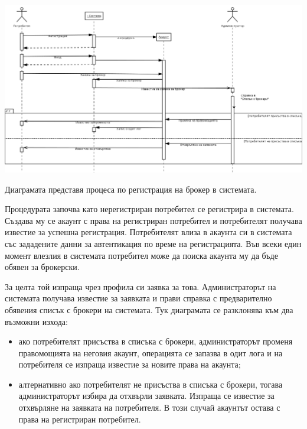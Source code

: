 \documentclass[a4paper]{article}
\begin{document}
\begin{center}
\includegraphics[scale=0.3,keepaspectratio=true]{uml04}
\end{center}

Диаграмата представя процеса по регистрация на брокер в системата.

Процедурата започва като нерегистриран потребител се регистрира в системата. Създава му се акаунт с права на регистриран потребител и потребителят получава известие за успешна регистрация. Потребителят влиза в акаунта си в системата със зададените данни за автентикация по време на регистрацията. Във всеки един момент влезлия в системата потребител може да поиска акаунта му да бъде обявен за брокерски.

За целта той изпраща чрез профила си заявка за това. Администраторът на системата получава известие за заявката и прави справка с предварително обявения списък с брокери на системата. Тук диаграмата се разклонява към два възможни изхода:
\begin{itemize}
\item ако потребителят присъства в списъка с брокери, администраторът променя правомощията на неговия акаунт, операцията се запазва в одит лога и на потребителя се изпраща известие за новите права на акаунта;
\item алтернативно ако потребителят не присъства в списъка с брокери, тогава администраторът избира да отхвърли заявката. Изпраща се известие за отхвърляне на заявката на потребителя. В този случай акаунтът остава с права на регистриран потребител.
\end{itemize}

\clearpage
%
%
\end{document}
